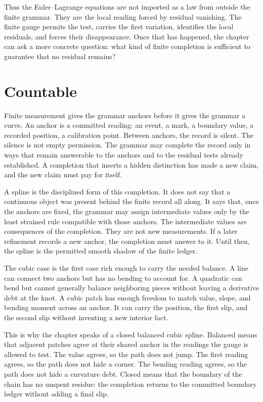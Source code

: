 Thus the Euler--Lagrange equations are not imported as a law from outside
the finite grammar. They are the local reading forced by residual
vanishing. The finite gauge permits the test, carries the first variation,
identifies the local residuals, and forces their disappearance. Once that
has happened, the chapter can ask a more concrete question: what kind of
finite completion is sufficient to guarantee that no residual remains?

\section{Countable}

Finite measurement gives the grammar anchors before it gives the grammar a
curve. An anchor is a committed reading: an event, a mark, a boundary value,
a recorded position, a calibration point. Between anchors, the record is
silent. The silence is not empty permission. The grammar may complete the
record only in ways that remain answerable to the anchors and to the
residual tests already established. A completion that inserts a hidden
distinction has made a new claim, and the new claim must pay for itself.

A spline is the disciplined form of this completion. It does not say that a
continuous object was present behind the finite record all along. It says
that, once the anchors are fixed, the grammar may assign intermediate
values only by the least strained rule compatible with those anchors. The
intermediate values are consequences of the completion. They are not new
measurements. If a later refinement records a new anchor, the completion
must answer to it. Until then, the spline is the permitted smooth shadow of
the finite ledger.

The cubic case is the first case rich enough to carry the needed balance.
A line can connect two anchors but has no bending to account for. A
quadratic can bend but cannot generally balance neighboring pieces without
leaving a derivative debt at the knot. A cubic patch has enough freedom to
match value, slope, and bending moment across an anchor. It can carry the
position, the first slip, and the second slip without inventing a new
interior fact.

This is why the chapter speaks of a closed balanced cubic spline. Balanced
means that adjacent patches agree at their shared anchor in the readings the
gauge is allowed to test. The value agrees, so the path does not jump. The
first reading agrees, so the path does not hide a corner. The bending
reading agrees, so the path does not hide a curvature debt. Closed means
that the boundary of the chain has no unspent residue: the completion
returns to the committed boundary ledger without adding a final slip.

